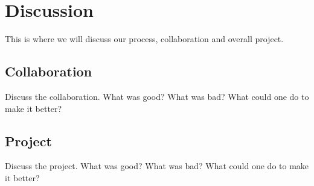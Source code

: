 \section{Discussion}
This is where we will discuss our process, collaboration and overall project.
\subsection{Collaboration}
Discuss the collaboration. What was good? What was bad? What could one do to make it better?
\subsection{Project}
Discuss the project. What was good? What was bad? What could one do to make it better?